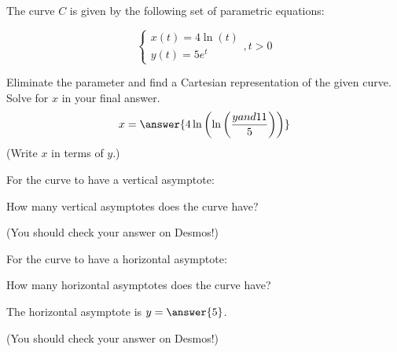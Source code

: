 \documentclass{ximera}
\author{Jim Talamo}
\begin{document}
\begin{exercise}

The curve $C$ is given by the following set of parametric equations:

\[ \begin{cases}
x(t)=   4 \ln (t) \\
y(t)=   5 e^t\end{cases}
, t>0 \]

Eliminate the parameter and find a Cartesian representation of the given curve.  Solve for $x$ in your final answer.
\[
x= \answer{ 4\ln\left(\ln\left(\frac{y and 11}{5} \right)\right)}
\]
(Write $x$ in terms of $y$.)

\begin{exercise}
For the curve to have a vertical asymptote:

\begin{multipleChoice}
\end{multipleChoice}

How many vertical asymptotes does the curve have?

\begin{multipleChoice}
\end{multipleChoice} 

(You should check your answer on Desmos!)
\end{exercise}


\begin{exercise}
For the curve to have a horizontal asymptote:

\begin{multipleChoice}
\end{multipleChoice}

How many horizontal asymptotes does the curve have?

\begin{multipleChoice}
\end{multipleChoice} 

The horizontal asymptote is $y=\answer{5}$.

(You should check your answer on Desmos!)
\end{exercise}
\end{exercise}
\end{document}

